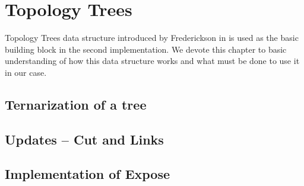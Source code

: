 \chapter{Topology Trees}

Topology Trees data structure introduced by Frederickson in
\cite{DSforDynamicallyMaintainingRootedTrees} is used as the basic building
block in the second implementation. We devote this chapter to basic
understanding of how this data structure works and what must be done to use
it in our case.


\section{Ternarization of a tree}

\section{Updates -- Cut and Links}

\section{Implementation of Expose}

